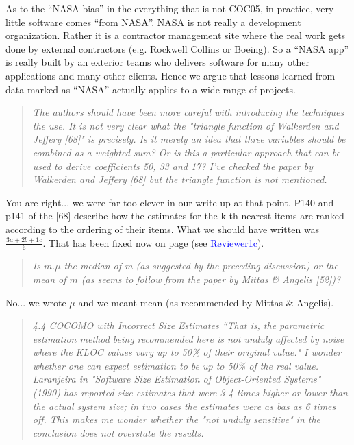 \documentclass[smallcondesed]{svjour3}
\newcommand{\WHERE}[1]{page \pageref{err:#1} (see \textcolor{blue}{#1})}
\begin{document}
  As to the ``NASA bias'' in the everything that is not COC05,
  in practice, very little software comes
``from NASA''. NASA is not
really a development organization. Rather it is a contractor
management site where the real work gets done by external
contractors (e.g. Rockwell Collins or Boeing). So a ``NASA app''
is really built by an exterior teams who delivers software
for many other applications and many other clients. Hence we argue
that lessons learned from data
marked as ``NASA'' actually applies
to a wide range of projects.
 
     \begin{quote}{\em The authors should have been more careful with introducing the techniques the use. It is not very clear what the "triangle function of Walkerden and Jeffery [68]" is precisely. Is it merely an idea that three variables should be combined as a weighted sum? Or is this a particular approach that can be used to derive coefficients 50, 33 and 17? I've checked the paper by Walkerden and Jeffery [68] but the triangle function is not mentioned.}\end{quote}

     \noindent You are right... we were far too clever in our write up at that
     point.
     P140 and p141 of the [68] describe how the estimates for the k-th
     nearest items are ranked according to the ordering of their items.
     What we should have written was $\frac{3a + 2b + 1c}{6}$. That has been fixed now on  \WHERE{Reviewer1c}.

     \begin{quote}{\em     Is $m.\mu$ the median of m (as suggested by the preceding discussion) or the mean of $m$ (as seems to follow from the paper by Mittas \& Angelis [52])?}\end{quote}

\noindent No... we wrote $\mu$ and we meant mean (as recommended by Mittas     \& Angelis).
 

\begin{quote}{\em 4.4 COCOMO with Incorrect Size Estimates ``That
  is, the parametric estimation method being
  recommended here is not unduly affected by noise
  where the KLOC values vary up to 50\% of their
  original value." I wonder whether one can expect
  estimation to be up to 50\% of the real
  value. Laranjeira in "Software Size Estimation of
  Object-Oriented Systems" (1990) has reported size
  estimates that were 3-4 times higher or lower than
  the actual system size; in two cases the estimates
  were as bas as 6 times off. This makes me wonder
  whether the "not unduly sensitive" in the
  conclusion does not overstate the results.}\end{quote}
\end{document}
